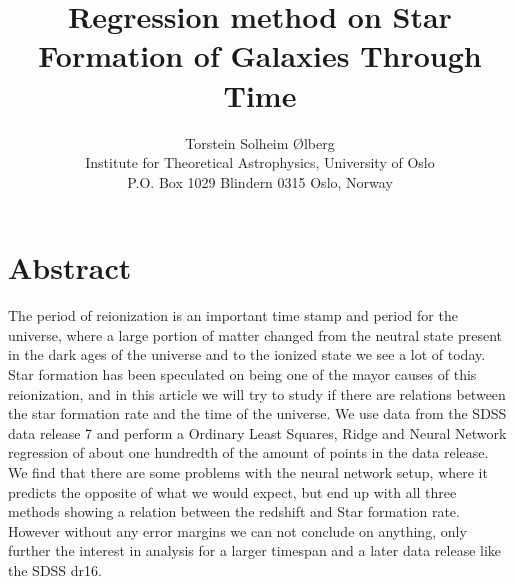 \documentclass[11pt, A4paper, english]{article}
\author{
Torstein Solheim Ølberg \\
Institute for Theoretical Astrophysics, University of Oslo \\
P.O. Box 1029 Blindern 0315 Oslo, Norway
}
\title{Regression method on Star Formation of Galaxies Through Time}
\begin{document}
	
\maketitle
\tableofcontents
\clearpage
	
	\section{Abstract}
The period of reionization is an important time stamp and period for the universe, where a large portion of matter changed from the neutral state present in the dark ages of the universe and to the ionized state we see a lot of today. Star formation has been speculated on being one of the mayor causes of this reionization, and in this article we will try to study if there are relations between the star formation rate and the time of the universe. We use data from the SDSS data release 7 and perform a Ordinary Least Squares, Ridge and Neural Network regression of about one hundredth of the amount of points in the data release. We find that there are some problems with the neural network setup, where it predicts the opposite of what we would expect, but end up with all three methods showing a relation between the redshift and Star formation rate. However without any error margins we can not conclude on anything, only further the interest in analysis for a larger timespan and a later data release like the SDSS dr16.
	
\end{document}
